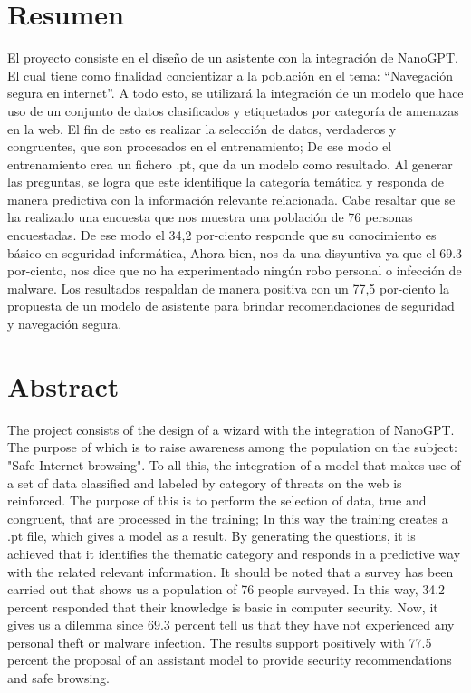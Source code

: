 \documentclass[12pt,letterpaper,fleqn]{report}
\begin{document}
\chapter*{Resumen}
El proyecto consiste en el diseño de un asistente con la integración de NanoGPT.
El cual tiene como finalidad concientizar a la población en el tema: “Navegación segura en internet”.
A todo esto, se utilizará la integración de un modelo que hace uso de un conjunto de datos clasificados y etiquetados por categoría de amenazas en la web. El fin de esto es realizar la selección de datos, verdaderos y congruentes, que son procesados en el entrenamiento; De ese modo el entrenamiento crea un fichero .pt, que da un modelo como resultado. Al generar las preguntas, se logra que este identifique la categoría temática y responda de manera predictiva con la información relevante relacionada. 
Cabe resaltar que se ha realizado una encuesta que nos muestra una población de 76 personas encuestadas. De ese modo el 34,2 por-ciento responde que su conocimiento es básico en seguridad informática, Ahora bien, nos da una disyuntiva ya que el 69.3 por-ciento, nos dice que no ha experimentado ningún robo personal o infección de malware. Los resultados respaldan de manera positiva con un 77,5 por-ciento la propuesta de un modelo de asistente para brindar recomendaciones de seguridad y navegación segura.

 \cleardoublepage
\chapter*{Abstract}
The project consists of the design of a wizard with the integration of NanoGPT.
The purpose of which is to raise awareness among the population on the subject: "Safe Internet browsing".
To all this, the integration of a model that makes use of a set of data classified and labeled by category of threats on the web is reinforced. The purpose of this is to perform the selection of data, true and congruent, that are processed in the training; In this way the training creates a .pt file, which gives a model as a result. By generating the questions, it is achieved that it identifies the thematic category and responds in a predictive way with the related relevant information.
It should be noted that a survey has been carried out that shows us a population of 76 people surveyed. In this way, 34.2 percent responded that their knowledge is basic in computer security. Now, it gives us a dilemma since 69.3 percent tell us that they have not experienced any personal theft or malware infection. The results support positively with 77.5 percent the proposal of an assistant model to provide security recommendations and safe browsing.
\end{document}
